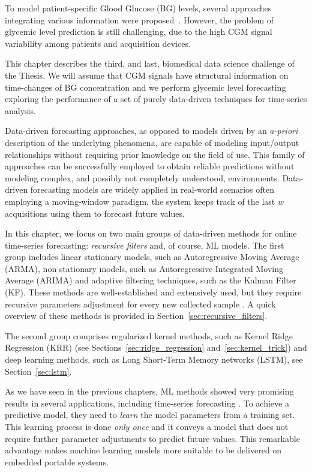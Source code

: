 

To model patient-specific Glood Glucose (BG) levels, several approaches integrating various information were proposed~\cite{bunescu2013blood, zecchin2011new}. However, the problem of glycemic level prediction is still challenging, due to the high CGM signal variability among patients and acquisition devices.

This chapter describes the third, and last, biomedical data science challenge of the Thesis. We will assume that CGM signals have structural information on time-changes of BG concentration \cite{sparacino2007glucose, bunescu2013blood} and we perform glycemic level forecasting exploring the performance of a set of purely data-driven techniques for time-series analysis.

Data-driven forecasting approaches, as opposed to models driven by an \textit{a-priori} description of the underlying phenomena, are capable of modeling input/output relationships without requiring prior knowledge on the field of use. This family of approaches can be successfully employed to obtain reliable predictions without modeling complex, and possibly not completely understood, environments. Data-driven forecasting models are widely applied in  real-world scenarios often employing a moving-window paradigm, \ie the system keeps track of the last $w$ acquisitions using them to forecast future values.

In this chapter, we focus on two main groups of data-driven methods for online time-series forecasting: \textit{recursive filters} and, of course, ML models.
The first group includes linear stationary models, such as Autoregressive Moving Average (\ac{ARMA}), non stationary models, such as Autoregressive Integrated Moving Average (\ac{ARIMA}) and adaptive filtering techniques, such as the Kalman Filter (\ac{KF}). These methods are well-established and extensively used, but they require recursive parameters adjustment for every new collected sample \cite{box2015time}.
A quick overview of these methods is provided in Section~\ref{sec:recursive_filters}. 

The second group comprises regularized kernel methods, such as Kernel Ridge Regression (\ac{KRR}) (see Sections~\ref{sec:ridge_regression} and~\ref{sec:kernel_trick}) and deep learning methods, such as Long Short-Term Memory networks (\ac{LSTM}), see Section~\ref{sec:lstm}.

As we have seen in the previous chapters, ML methods showed very promising results in several applications, including time-series forecasting \cite{bunescu2013blood, schmidhuber2005evolino}. To achieve a predictive model, they need to \textit{learn} the model parameters from a training set. This learning process is done \textit{only once} and it conveys a model that does not require further parameter adjustments to predict future values. This remarkable advantage makes machine learning models more suitable to be delivered on embedded portable systems.


